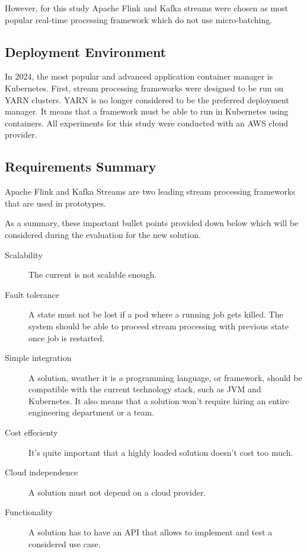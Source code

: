 However, for this study Apache Flink and Kafka streams were chosen as most popular real-time processing
framework which do not use micro-batching.

\subsection{Deployment Environment}\label{subsec:deployment-environment}
In 2024, the most popular and advanced application container manager is Kubernetes.
First, stream processing frameworks were designed to be run on YARN clusters.
YARN is no longer considered to be the preferred deployment manager.
It means that a framework must be able to run in Kubernetes using containers.
All experiments for this study were conducted with an AWS cloud provider.


\subsection{Requirements Summary}\label{subsec:final-requirements}
Apache Flink and Kafka Streams are two leading stream processing frameworks
that are used in prototypes.

As a summary, these important bullet points provided down below which will
be considered during the evaluation for the new solution.

\begin{description}
    \item[Scalability] The current is not scalable enough.
    \item[Fault tolerance] A state must not be lost if a pod where a running job gets killed.
    The system should be able to proceed stream processing with previous state once job is restarted.
    \item[Simple integration] A solution, weather it is a programming language,
    or framework, should be compatible with the current technology stack, such as JVM and Kubernetes.
    It also means that a solution won't require hiring an entire engineering department or a team.
    \item[Cost effecienty] It's quite important that a highly loaded solution doesn't cost too much.
    \item[Cloud independence] A solution must not depend on a cloud provider.
    \item[Functionality] A solution has to have an API that allows to implement and test a considered use case.
\end{description}


